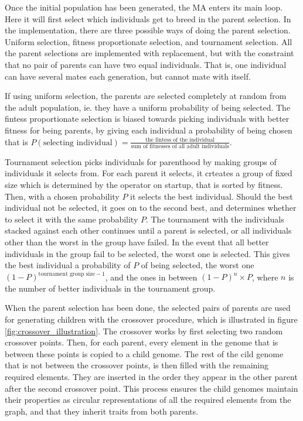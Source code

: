 Once the initial population has been generated, the MA enters its main loop. Here it will first select which individuals get to breed in the parent selection. In the implementation, there are three possible ways of doing the parent selection. Uniform selection, fitness proportionate selection, and tournament selection. All the parent selections are implemented with replacement, but with the constraint that no pair of parents can have two equal individuals. That is, one individual can have several mates each generation, but cannot mate with itself.

If using uniform selection, the parents are selected completely at random from the adult population, ie. they have a uniform probability of being selected. The fintess proportionate selection is biased towards picking individuals with better fitness for being parents, by giving each individual a probability of being chosen that is $P(\text{selecting individual}) = \frac{\text{the fintess of the individual}}{\text{sum of fitnesses of all adult individuals}}$.

Tournament selection picks individuals for parenthood by making groups of individuals it selects from. For each parent it selects, it crteates a group of fixed size which is determined by the operator on startup, that is sorted by fitness. Then, with a chosen probability $P$ it selects the best individual. Should the best individual not be selected, it goes on to the second best, and determines whether to select it with the same probability $P$. The tournament with the individuals stacked against each other continues until a parent is selected, or all individuals other than the worst in the group have failed. In the event that all better individuals in the group fail to be selected, the worst one is selected. This gives the best individual a probability of $P$ of being selected, the worst one $(1-P)^{\text{tournament group size}-1}$, and the ones in between $(1-P)^{n} \times P$, where $n$ is the number of better individuals in the tournament group.

When the parent selection has been done, the selected pairs of parents are used for generating children with the crossover procedure, which is illustrated in figure \ref{fig:crossover_illustration}. The crossover works by first selecting two random crossover points. Then, for each parent, every element in the genome that is between these points is copied to a child genome. The rest of the cild genome that is not between the crossover points, is then filled with the remaining required elements. They are inserted in the order they appear in the other parent after the second crossover point. This process ensures the child genomes maintain their properties as circular representations of all the required elements from the graph, and that they inherit traits from both parents.

